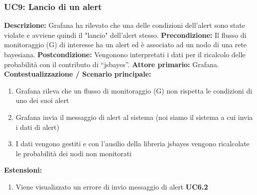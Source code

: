 		        \subsubsection{UC9: Lancio di un alert}
                    \textbf{Descrizione:} Grafana ha rilevato che una delle condizioni dell'alert sono state violate e avviene quindi il "lancio" dell'alert stesso.
                    \newline
                    \textbf{Precondizione:} Il flusso di monitoraggio (G) di interesse ha un alert ed è associato ad un nodo di una rete bayesiana.
                    \newline
                    \textbf{Postcondizione:} Vengonono interpretati i dati per il ricalcolo delle probabilità con il contributo di “jsbayes”.
                    \newline
                    \textbf{Attore primario:} Grafana.
                    \newline
                    \textbf{Contestualizzazione / Scenario principale:} \begin{enumerate}
                            \item Grafana rileva che un flusso di monitoraggio (G) non rispetta le condizioni di uno dei suoi alert
                            \item Grafana invia il messaggio di alert al sistema (noi siamo il sistema a cui invia i dati di alert)
                            \item I dati vengono gestiti e con l’ausilio della libreria jsbayes vengono ricalcolate le probabilità dei nodi non monitorati
                        \end{enumerate}
                    
                    \textbf{Estensioni:} 
                    \begin{enumerate}
                            \item Viene visualizzato un errore di invio messaggio di alert \textbf{UC6.2}
                        \end{enumerate}
                        
